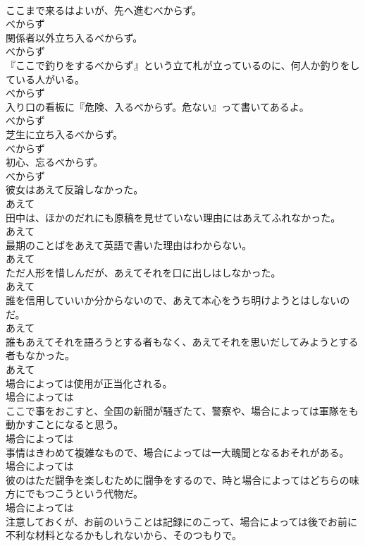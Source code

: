 \documentclass[8pt]{extreport}
\begin{document}
\begin{CJK}{UTF8}{min}
\\	ここまで来るはよいが、先へ進むべからず。	
\\	べからず
\\	関係者以外立ち入るべからず。	
\\	べからず
\\	『ここで釣りをするべからず』という立て札が立っているのに、何人か釣りをしている人がいる。	
\\	べからず
\\	入り口の看板に『危険、入るべからず。危ない』って書いてあるよ。	
\\	べからず
\\	芝生に立ち入るべからず。	
\\	べからず
\\	初心、忘るべからず。	
\\	べからず
\\	彼女はあえて反論しなかった。	
\\	あえて
\\	田中は、ほかのだれにも原稿を見せていない理由にはあえてふれなかった。	
\\	あえて
\\	最期のことばをあえて英語で書いた理由はわからない。	
\\	あえて
\\	ただ人形を惜しんだが、あえてそれを口に出しはしなかった。	
\\	あえて
\\	誰を信用していいか分からないので、あえて本心をうち明けようとはしないのだ。	
\\	あえて
\\	誰もあえてそれを語ろうとする者もなく、あえてそれを思いだしてみようとする者もなかった。	
\\	あえて
\\	場合によっては使用が正当化される。	
\\	場合によっては
\\	ここで事をおこすと、全国の新聞が騒ぎたて、警察や、場合によっては軍隊をも動かすことになると思う。	
\\	場合によっては
\\	事情はきわめて複雑なもので、場合によっては一大醜聞となるおそれがある。	
\\	場合によっては
\\	彼のはただ闘争を楽しむために闘争をするので、時と場合によってはどちらの味方にでもつこうという代物だ。	
\\	場合によっては
\\	注意しておくが、お前のいうことは記録にのこって、場合によっては後でお前に不利な材料となるかもしれないから、そのつもりで。	

\end{CJK}
\end{document}
